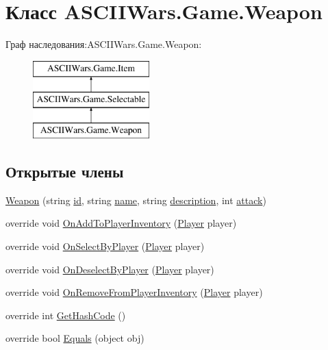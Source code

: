 \hypertarget{class_a_s_c_i_i_wars_1_1_game_1_1_weapon}{}\section{Класс A\+S\+C\+I\+I\+Wars.\+Game.\+Weapon}
\label{class_a_s_c_i_i_wars_1_1_game_1_1_weapon}
Граф наследования\+:A\+S\+C\+I\+I\+Wars.\+Game.\+Weapon\+:\begin{figure}[H]
\begin{center}
\leavevmode
\includegraphics[height=3.000000cm]{class_a_s_c_i_i_wars_1_1_game_1_1_weapon}
\end{center}
\end{figure}
\subsection*{Открытые члены}
\begin{DoxyCompactItemize}
\item 
\hyperlink{class_a_s_c_i_i_wars_1_1_game_1_1_weapon_ab292fb175c5d6e29ec2918069f831d4c}{Weapon} (string \hyperlink{class_a_s_c_i_i_wars_1_1_game_1_1_item_a744d51f7684a4e46a1f834f8666db58e}{id}, string \hyperlink{class_a_s_c_i_i_wars_1_1_game_1_1_item_a994b9ec5f10c123e4345da159c090091}{name}, string \hyperlink{class_a_s_c_i_i_wars_1_1_game_1_1_item_a6ff41e953ccebc64a8df8f8c434535a0}{description}, int \hyperlink{class_a_s_c_i_i_wars_1_1_game_1_1_weapon_a70166ce84757794de92f0a52de55bb04}{attack})
\item 
override void \hyperlink{class_a_s_c_i_i_wars_1_1_game_1_1_weapon_ad29135a3edb4ea03f29163d788364299}{On\+Add\+To\+Player\+Inventory} (\hyperlink{class_a_s_c_i_i_wars_1_1_game_1_1_player}{Player} player)
\item 
override void \hyperlink{class_a_s_c_i_i_wars_1_1_game_1_1_weapon_a6cd549ad51fa64884a66b1083098465f}{On\+Select\+By\+Player} (\hyperlink{class_a_s_c_i_i_wars_1_1_game_1_1_player}{Player} player)
\item 
override void \hyperlink{class_a_s_c_i_i_wars_1_1_game_1_1_weapon_aa03a588bfb93fbf63d4d7bf63ce62ae1}{On\+Deselect\+By\+Player} (\hyperlink{class_a_s_c_i_i_wars_1_1_game_1_1_player}{Player} player)
\item 
override void \hyperlink{class_a_s_c_i_i_wars_1_1_game_1_1_weapon_a1fc9edec1d3881aee188a30ddc8f9e58}{On\+Remove\+From\+Player\+Inventory} (\hyperlink{class_a_s_c_i_i_wars_1_1_game_1_1_player}{Player} player)
\item 
override int \hyperlink{class_a_s_c_i_i_wars_1_1_game_1_1_weapon_af252081d5a5f047785ed545946bb5214}{Get\+Hash\+Code} ()
\item 
override bool \hyperlink{class_a_s_c_i_i_wars_1_1_game_1_1_weapon_a281a4ca4d8a376aeda8408551ee168cf}{Equals} (object obj)
\end{DoxyCompactItemize}
